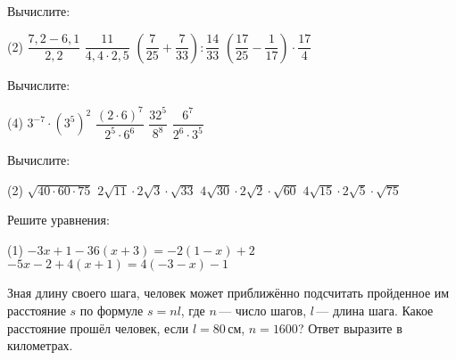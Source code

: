 \begin{homework}[number=1]	
	\begin{listofex}
		\item Вычислите:
		\begin{tasks}(2)
			\task \( \dfrac{7,2-6,1}{2,2} \)
			\task \( \dfrac{11}{4,4\cdot2,5} \)
			\task \( \left( \dfrac{7}{25}+\dfrac{7}{33} \right):\dfrac{14}{33} \)
			\task \( \left( \dfrac{17}{25}-\dfrac{1}{17} \right)\cdot\dfrac{17}{4} \)
		\end{tasks}
		\item Вычислите:
		\begin{tasks}(4)
			\task \( 3^{-7}\cdot(3^5)^2 \)
			\task \( \dfrac{(2\cdot6)^7}{2^5\cdot6^6} \)
			\task \( \dfrac{32^5}{8^8} \)
			\task \( \dfrac{6^7}{2^6\cdot3^5} \)
		\end{tasks}
		\item Вычислите:
		\begin{tasks}(2)
			\task \( \sqrt{40\cdot60\cdot75} \)
			\task \( 2\sqrt{11}\cdot2\sqrt{3}\cdot\sqrt{33} \)
			\task \( 4\sqrt{30}\cdot2\sqrt{2}\cdot\sqrt{60} \)
			\task \( 4\sqrt{15}\cdot2\sqrt{5}\cdot\sqrt{75} \)
		\end{tasks}
		\item Решите уравнения:
		\begin{tasks}(1)
			\task \( -3x+1-36(x+3)=-2(1-x)+2 \)
			\task \( -5x-2+4(x+1)=4(-3-x)-1 \)
		\end{tasks}
		\item Зная длину своего шага, человек может приближённо подсчитать пройденное им расстояние \( s \) по формуле \( s=nl \), где \( n \) --- число шагов, \( l \) --- длина шага. Какое расстояние прошёл человек, если \( l=80 \) см, \( n=1600 \)? Ответ выразите в километрах.
	\end{listofex}
\end{homework}

